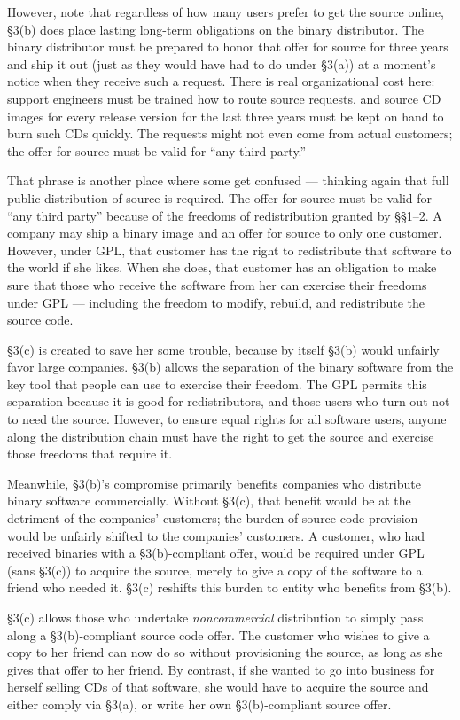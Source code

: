 \documentclass[11pt, letterpaper]{book}
\begin{document}
However, note that regardless of how many users prefer to get the
source online, \S 3(b) does place lasting long-term obligations on the
binary distributor. The binary distributor must be prepared to honor
that offer for source for three years and ship it out (just as they
would have had to do under \S 3(a)) at a moment's notice when they
receive such a request. There is real organizational cost here:
support engineers must be trained how to route source requests, and
source CD images for every release version for the last three years
must be kept on hand to burn such CDs quickly. The requests might not
even come from actual customers; the offer for source must be valid
for ``any third party.''

That phrase is another place where some get confused --- thinking again
that full public distribution of source is required. The offer for source
must be valid for ``any third party'' because of the freedoms of
redistribution granted by \S\S 1--2. A company may ship a binary image
and an offer for source to only one customer. However, under GPL, that
customer has the right to redistribute that software to the world if she
likes. When she does, that customer has an obligation to make sure that
those who receive the software from her can exercise their freedoms under
GPL --- including the freedom to modify, rebuild, and redistribute the
source code.

\S 3(c) is created to save her some trouble, because by itself \S 3(b)
would unfairly favor large companies. \S 3(b) allows the
separation of the binary software from the key tool that people can use
to exercise their freedom. The GPL permits this separation because it is
good for redistributors, and those users who turn out not to need the
source. However, to ensure equal rights for all software users, anyone
along the distribution chain must have the right to get the source and
exercise those freedoms that require it.

Meanwhile, \S 3(b)'s compromise primarily benefits companies who
distribute binary software commercially. Without \S 3(c), that benefit
would be at the detriment of the companies' customers; the burden of
source code provision would be unfairly shifted to the companies'
customers. A customer, who had received binaries with a \S 3(b)-compliant
offer, would be required under GPL (sans \S 3(c)) to acquire the source,
merely to give a copy of the software to a friend who needed it. \S 3(c)
reshifts this burden to entity who benefits from \S 3(b).

\S 3(c) allows those who undertake \emph{noncommercial} distribution to
simply pass along a \S 3(b)-compliant source code offer. The customer who
wishes to give a copy to her friend can now do so without provisioning the
source, as long as she gives that offer to her friend. By contrast, if
she wanted to go into business for herself selling CDs of that software,
she would have to acquire the source and either comply via \S 3(a), or
write her own \S 3(b)-compliant source offer.
\end{document}
